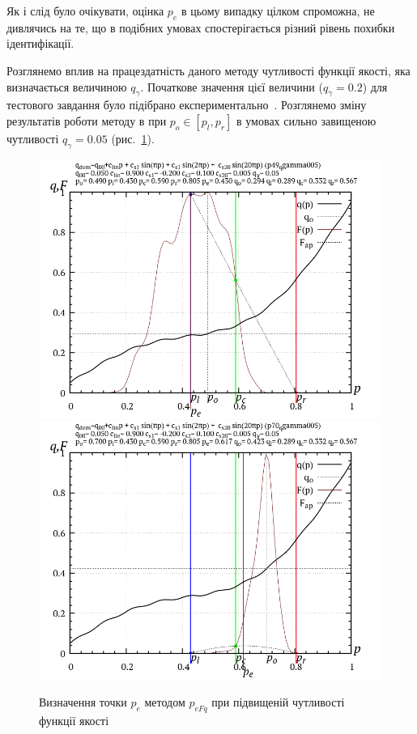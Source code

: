 Як і слід було очікувати, оцінка $p_e$ в цьому випадку цілком спроможна, не
дивлячись на те, що в подібних умовах спостерігається різний рівень похибки
ідентифікації.

Розглянемо вплив на працездатність даного методу чутливості
функції якості, яка визначається величиною
$q_\gamma$. Початкове значення цієї величини
($q_\gamma = 0.2$) для тестового завдання було підібрано
експериментально~\cite{atu_asau22}. Розглянемо зміну результатів
роботи методу в при
$p_o \in [p_l, p_r]$ в умовах сильно завищеною чутливості
$q_\gamma = 0.05$ (рис.~\ref{atu:f:p_eFq_intra_005}).


\begin{figure}[htb!]
  \begin{center}
    \includegraphics[width=49\TW]{p/p_eFq/q_p_eFq_p49_qgamma005.png}
    \hfill
    \includegraphics[width=49\TW]{p/p_eFq/q_p_eFq_p70_qgamma005.png}
  \end{center}
  \caption{Визначення точки $p_e$ методом $p_{eFq}$ при підвищеній чутливості функції якості}
  \label{atu:f:p_eFq_intra_005}
\end{figure}

